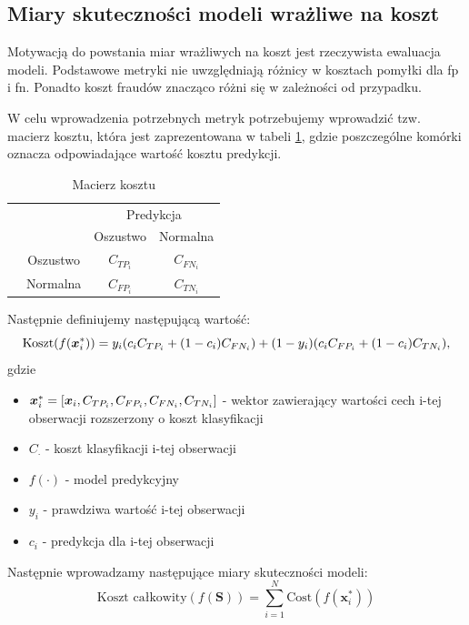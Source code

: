 \documentclass{book}
\begin{document}
\subsection{Miary skuteczności modeli wrażliwe na koszt}

	Motywacją do powstania miar wrażliwych na koszt jest rzeczywista ewaluacja modeli. Podstawowe metryki nie uwzględniają różnicy w kosztach pomyłki dla fp i fn. Ponadto koszt fraudów znacząco różni się w zależności od przypadku.

	W celu wprowadzenia potrzebnych metryk potrzebujemy wprowadzić tzw. macierz kosztu, która jest zaprezentowana w tabeli \ref{macierz-kosztu}, gdzie poszczególne komórki oznacza odpowiadające wartość kosztu predykcji. 
	\begin{table}[h]
		\begin{center}
			\makegapedcells
			\begin{tabular}{cc|cc}
				\multicolumn{2}{c}{}     &   \multicolumn{2}{c}{Predykcja} \\
				&            &   Oszustwo &   Normalna     \\ 
				\cline{2-4}
				\multirow{2}{*}{\rotatebox[origin=c]{90}{Prawda}} & Oszustwo   & $C_{TP_{i}}$         & $C_{FN_{i}}$              \\
				& Normalna   & $C_{FP_{i}}$         & $C_{TN_{i}}$              \\ 
				\cline{2-4}
			\end{tabular}
		\end{center}
		\caption{Macierz kosztu}
		\label{macierz-kosztu}
	\end{table}
	Następnie definiujemy następującą wartość:
	$$ \text{Koszt}(f(\boldsymbol{x}_{i}^{*})) = y_i (c_i C_{TP_i} + (1-c_i)C_{FN_i}) + (1-y_i)(c_i C_{FP_i} + (1-c_i)C_{TN_i}) \text{,}$$
	gdzie 
	\begin{itemize}
		\item $\boldsymbol{x}_{i}^{*} = [\boldsymbol{x}_i, C_{TP_{i}}, C_{FP_{i}}, C_{FN_{i}}, C_{TN_{i}}]$ - wektor zawierający wartości cech i-tej obserwacji rozszerzony o koszt klasyfikacji
		\item $C_{\cdot}$ - koszt klasyfikacji i-tej obserwacji
		\item $f(\cdot)$ - model predykcyjny
		\item $y_i$ - prawdziwa wartość i-tej obserwacji
		\item $c_i$ - predykcja dla i-tej obserwacji
	\end{itemize}{}
    Następnie wprowadzamy następujące miary skuteczności modeli:
	\begin{equation}
		\label{koszt-calkowity}
		\text{Koszt całkowity}(f(\boldsymbol{S})) = \sum_{i=1}^{N}\text{Cost}(f(\boldsymbol{x}_{i}^{*}))
	\end{equation} 
\end{document}
